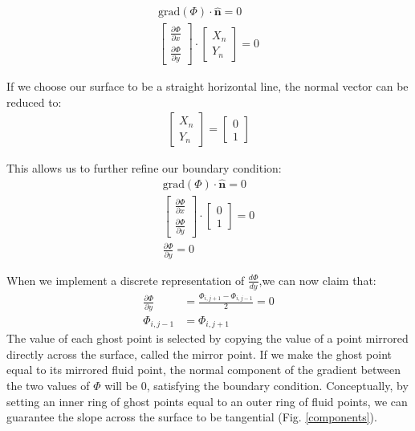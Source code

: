 \documentclass[11pt]{article}
\begin{document}
\begin{align}
    \text{grad}(\Phi) \cdot \hat{\textbf{n}} = 0 \\
    \begin{bmatrix} \frac{\partial\Phi}{\partial x} \\[6pt] \frac{\partial\Phi}{\partial y} \end{bmatrix}
    \cdot
    \begin{bmatrix} X_n \\  Y_n \end{bmatrix} = 0
\end{align}

If we choose our surface to be a straight horizontal line, the normal vector can be reduced to:
\begin{align}
    \begin{bmatrix} X_n \\  Y_n \end{bmatrix}
    =
    \begin{bmatrix} 0 \\  1 \end{bmatrix} 
\end{align}

This allows us to further refine our boundary condition:
\begin{align}
    \text{grad}(\Phi) \cdot \hat{\textbf{n}} = 0 \\
    \begin{bmatrix} \frac{\partial\Phi}{\partial x} \\[6pt] \frac{\partial\Phi}{\partial y} \end{bmatrix}
    \cdot
    \begin{bmatrix} 0 \\  1 \end{bmatrix}  = 0 \\ 
    \frac{\partial\Phi}{\partial y} = 0
\end{align}

When we implement a discrete representation of $\frac{d\Phi}{dy}$,we can now claim that:
\begin{align}
    \frac{\partial\Phi}{\partial y} &= \frac{\Phi_{i,j+1} - \Phi_{i,j-1}}{2} = 0 \\
    \Phi_{i,j-1} &= \Phi_{i,j+1}
\end{align}
The value of each ghost point is selected by copying the value of a point mirrored directly across the surface, called the mirror point. If we make the ghost point equal to its mirrored fluid point, the normal component of the gradient between the two values of $\Phi$ will be 0, satisfying the boundary condition. Conceptually, by setting an inner ring of ghost points equal to an outer ring of fluid points, we can guarantee the slope across the surface to be tangential (Fig. \ref{components}).
\end{document}

